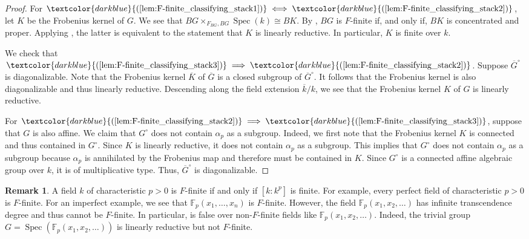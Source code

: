\documentclass[11pt]{amsart}
\def\eqref#1{\textcolor{darkblue}{(\ref{#1})}}
\theoremstyle{plain}
\theoremstyle{definition}
\newtheorem{remark}[theorem]{Remark}
\numberwithin{equation}{section}
\numberwithin{theorem}{section}
\begin{document}
\begin{proof}
    For $\eqref{lem:F-finite_classifying_stack1}\iff\eqref{lem:F-finite_classifying_stack2}$, let $K$ be the Frobenius kernel of $G$. We see that $BG\times_{F_{BG},BG}\operatorname{Spec}(k)\cong BK$. 
    By , $BG$ is $F$-finite if, and only if, $BK$ is concentrated and proper. 
    Applying \cite[Theorem B]{Hall/Rydh:2015}, the latter is equivalent to the statement that $K$ is linearly reductive. 
    In particular, $K$ is finite over $k$.

    We check that $\eqref{lem:F-finite_classifying_stack3}\implies\eqref{lem:F-finite_classifying_stack2}$.
    Suppose $\overline{G}^\circ$ is diagonalizable. 
    Note that the Frobenius kernel $\overline{K}$ of $\overline{G}$ is a closed subgroup of $\overline{G}^\circ$. 
    It follows that the Frobenius kernel is also diagonalizable and thus linearly reductive. 
    Descending along the field extension $\overline{k}/k$, we see that the Frobenius kernel $K$ of $G$ is linearly reductive.
    
    For $\eqref{lem:F-finite_classifying_stack2}\implies\eqref{lem:F-finite_classifying_stack3}$, suppose that $G$ is also affine. 
    We claim that $G^\circ$ does not contain $\alpha_p$ as a subgroup. 
    Indeed, we first note that the Frobenius kernel $K$ is connected and thus contained in $G^\circ$. Since $K$ is linearly reductive, it does not contain $\alpha_p$ as a subgroup. 
    This implies that $G^\circ$ does not contain $\alpha_p$ as a subgroup because $\alpha_p$ is annihilated by the Frobenius map and therefore must be contained in $K$. 
    Since $G^\circ$ is a connected affine algebraic group over $k$, it is of multiplicative type. 
    Thus, $\overline{G}^\circ$ is diagonalizable. 
\end{proof}

\begin{remark}
    \label{rmk:F-finite_fields}
    A field $k$ of characteristic $p>0$ is $F$-finite if and only if $[k:k^p]$ is finite. For example, every perfect field of characteristic $p>0$ is $F$-finite. For an imperfect example, we see that $\mathbb{F}_p(x_1,\ldots,x_n)$ is $F$-finite. However, the field $\mathbb{F}_p(x_1,x_2,\ldots)$ has infinite transcendence degree and thus cannot be $F$-finite. In particular,  is false over non-$F$-finite fields like $\mathbb{F}_p(x_1,x_2,\ldots)$. Indeed, the trivial group $G=\operatorname{Spec}(\mathbb{F}_p(x_1,x_2,\ldots))$ is linearly reductive but not $F$-finite. 
\end{remark}
\end{document}
